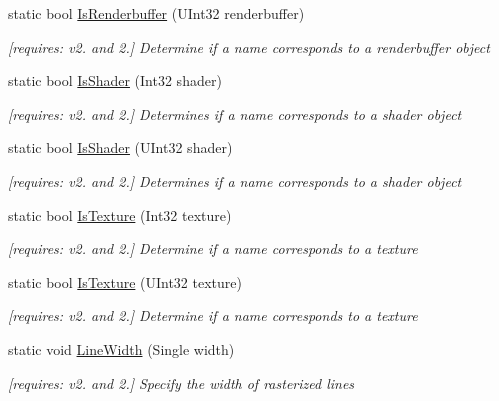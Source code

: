 \begin{DoxyCompactItemize}
static bool \hyperlink{class_open_t_k_1_1_graphics_1_1_e_s20_1_1_g_l_a850362c7f9dca64a828ae13e5dc6c402}{Is\-Renderbuffer} (U\-Int32 renderbuffer)
\begin{DoxyCompactList}\small\item\em \mbox{[}requires\-: v2. and 2.\mbox{]} Determine if a name corresponds to a renderbuffer object \end{DoxyCompactList}\item 
static bool \hyperlink{class_open_t_k_1_1_graphics_1_1_e_s20_1_1_g_l_aec6094bb56d2cf9d33c52c1627579dc3}{Is\-Shader} (Int32 shader)
\begin{DoxyCompactList}\small\item\em \mbox{[}requires\-: v2. and 2.\mbox{]} Determines if a name corresponds to a shader object \end{DoxyCompactList}\item 
static bool \hyperlink{class_open_t_k_1_1_graphics_1_1_e_s20_1_1_g_l_a93caf3345b073ad543257b5b2f2898a5}{Is\-Shader} (U\-Int32 shader)
\begin{DoxyCompactList}\small\item\em \mbox{[}requires\-: v2. and 2.\mbox{]} Determines if a name corresponds to a shader object \end{DoxyCompactList}\item 
static bool \hyperlink{class_open_t_k_1_1_graphics_1_1_e_s20_1_1_g_l_aba7603d82cf8634e134fadc524f8ce12}{Is\-Texture} (Int32 texture)
\begin{DoxyCompactList}\small\item\em \mbox{[}requires\-: v2. and 2.\mbox{]} Determine if a name corresponds to a texture \end{DoxyCompactList}\item 
static bool \hyperlink{class_open_t_k_1_1_graphics_1_1_e_s20_1_1_g_l_a8e110d64a0319571697726475fe562c2}{Is\-Texture} (U\-Int32 texture)
\begin{DoxyCompactList}\small\item\em \mbox{[}requires\-: v2. and 2.\mbox{]} Determine if a name corresponds to a texture \end{DoxyCompactList}\item 
static void \hyperlink{class_open_t_k_1_1_graphics_1_1_e_s20_1_1_g_l_aba230b2cb5270a4aa9f351ffa07f1b8b}{Line\-Width} (Single width)
\begin{DoxyCompactList}\small\item\em \mbox{[}requires\-: v2. and 2.\mbox{]} Specify the width of rasterized lines \end{DoxyCompactList}\item 

\end{DoxyCompactItemize}
